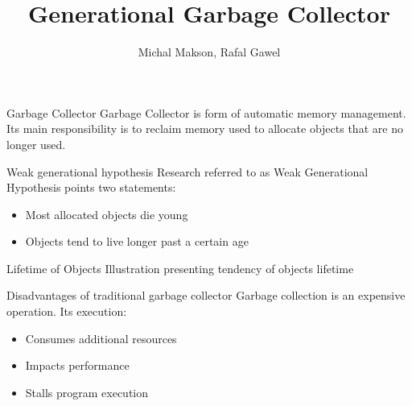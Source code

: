 \documentclass[presentation]{beamer}
\title{Generational Garbage Collector}
\author{Michal Makson, Rafal Gawel}
\institute{AGH}
\date{}
\begin{document}
\begin{frame}
  \titlepage
\end{frame}

\begin{frame}{Garbage Collector}
Garbage Collector is form of automatic memory management.\\
Its main responsibility is to reclaim memory used to allocate objects that are no longer used.
\end{frame}

\begin{frame}{Weak generational hypothesis}
	Research referred to as Weak Generational Hypothesis
	points two statements:
	\newline
	\begin{itemize}
		\item Most allocated objects die young
		\item Objects tend to live longer past a certain age
	\end{itemize}
\end{frame}

\begin{frame}{Lifetime of Objects}
Illustration presenting tendency of objects lifetime
\newline


\end{frame}

\begin{frame}{Disadvantages of traditional garbage collector}
	Garbage collection is an expensive operation.
	Its execution:
	\newline
	\begin{itemize}
		\item Consumes additional resources
		\item Impacts performance
		\item Stalls program execution
	\end{itemize}
	
\end{frame}
\end{document}
